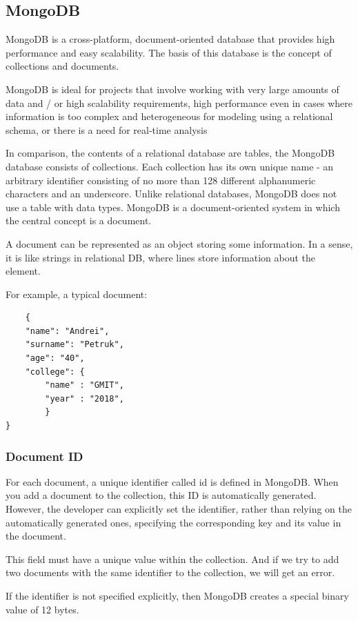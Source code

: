 \subsection{MongoDB}
MongoDB is a cross-platform, document-oriented database that provides high performance and easy scalability. The basis of this database is the concept of collections and documents.\par
MongoDB is ideal for projects that involve working with very large amounts of data and / or high scalability requirements, high performance even in cases where information is too complex and heterogeneous for modeling using a relational schema, or there is a need for real-time analysis \par
In comparison, the contents of a relational database are tables, the MongoDB database consists of collections. Each collection has its own unique name - an arbitrary identifier consisting of no more than 128 different alphanumeric characters and an underscore.
Unlike relational databases, MongoDB does not use a table with data types. MongoDB is a document-oriented system in which the central concept is a document. \par
A document can be represented as an object storing some information. In a sense, it is like strings in relational DB, where lines store information about the element. \cite{MongoDB} \par For example, a typical document:

\begin{verbatim}
	{
    "name": "Andrei",
    "surname": "Petruk",
    "age": "40",
    "college": {
        "name" : "GMIT",
        "year" : "2018",
        }
}
\end{verbatim}

\subsubsection{Document ID}
For each document, a unique identifier called id is defined in MongoDB. When you add a document to the collection, this ID is automatically generated. However, the developer can explicitly set the identifier, rather than relying on the automatically generated ones, specifying the corresponding key and its value in the document.\par
This field must have a unique value within the collection. And if we try to add two documents with the same identifier to the collection, we will get an error.\par
If the identifier is not specified explicitly, then MongoDB creates a special binary value of 12 bytes.\cite{MongoDBID}

